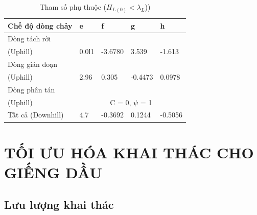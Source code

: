 \documentclass[12pt,a4paper]{report}
\begin{document}
\begin{table}[h]
\caption[Tham số phụ thuộc ($H_{L(0)} < \lambda_L$))]{Tham số phụ thuộc ($H_{L(0)} < \lambda_L$)) \cite{brill1999multiphase}}\label{fig:dependent_params_2}
\begin{tabularx}{\textwidth}{@{}XXXXX@{}}
\toprule
Chế độ dòng chảy                                                               & e         & f           & g           & h          \\ \midrule
Dòng tách rời\\ (Uphill)   & 0.0l1     & -3.6780     & 3.539       & -1.613     \\
Dòng gián đoạn\\ (Uphill) & 2.96      & 0.305       & -0.4473     & 0.0978     \\
Dòng phân tán\\ (Uphill)   & \multicolumn{4}{c}{C = 0, $\psi$ = 1} \\
Tất cả (Downhill)                                                              & 4.7       & -0.3692     & 0.1244      & -0.5056    \\ \bottomrule
\end{tabularx}
\end{table}

\chapter{TỐI ƯU HÓA KHAI THÁC CHO GIẾNG DẦU}
\section{Lưu lượng khai thác}
\end{document}

